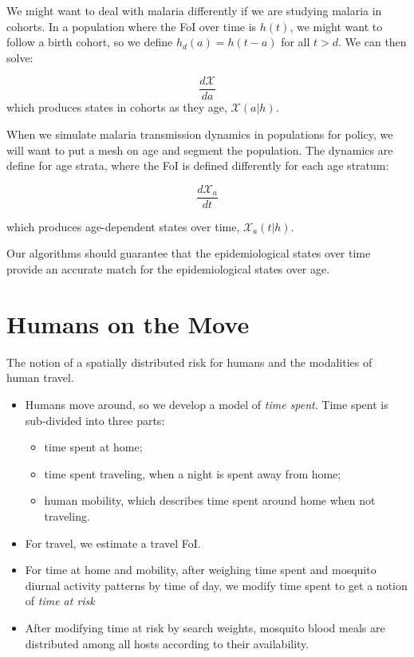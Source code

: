 \documentclass[
]{book}
\begin{document}
We might want to deal with malaria differently if we are studying malaria in cohorts. In a population where the FoI over time is \(h(t)\), we might want to follow a birth cohort, so we define \(h_d(a) = h(t-a)\) for all \(t>d\). We can then solve:

\[\frac{d{\mathscr X}}{d a} \]
which produces states in cohorts as they age, \({\mathscr X}(a|h).\)

When we simulate malaria transmission dynamics in populations for policy, we will want to put a mesh on age and segment the population. The dynamics are define for age strata, where the FoI is defined differently for each age stratum:

\[\frac{d{\mathscr X}_a}{d t}\]

which produces age-dependent states over time, \({\mathscr X}_a(t|h).\)

Our algorithms should guarantee that the epidemiological states over time provide an accurate match for the epidemiological states over age.

\hypertarget{humans-on-the-move}{%
\section{Humans on the Move}\label{humans-on-the-move}}

The notion of a spatially distributed risk for humans and the modalities of human travel.

\begin{itemize}
\item
  Humans move around, so we develop a model of \emph{time spent}. Time spent is sub-divided into three parts:

  \begin{itemize}
  \item
    time spent at home;
  \item
    time spent traveling, when a night is spent away from home;
  \item
    human mobility, which describes time spent around home when not traveling.
  \end{itemize}
\item
  For travel, we estimate a travel FoI.
\item
  For time at home and mobility, after weighing time spent and mosquito diurnal activity patterns by time of day, we modify time spent to get a notion of \emph{time at risk}
\item
  After modifying time at risk by search weights, mosquito blood meals are distributed among all hosts according to their availability.
\end{itemize}
\end{document}
